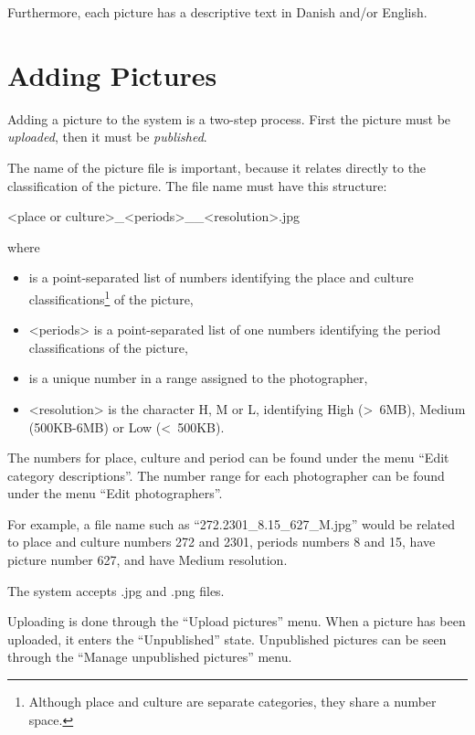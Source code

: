 \documentclass[11pt,oneside,a4paper,article]{memoir}
\begin{document}
Furthermore, each picture has a descriptive text in Danish and/or English.


\chapter{Adding Pictures}

Adding a picture to the system is a two-step process. First the picture must be \emph{uploaded},
then it must be \emph{published}.

\Needspace*{4cm}%
The name of the picture file is important, because it relates directly to the classification of the
picture. The file name must have this structure:

\begin{center}
<place or culture>\_<periods>\_<picture number>\_<resolution>.jpg
\end{center}

\noindent
where

\begin{itemize}
\item <place or culture> is a point-separated list of numbers identifying the place and culture
  classifications\footnote{Although place and culture are separate categories, they share a number
    space.} of the picture,
\item <periods> is a point-separated list of one numbers identifying the period classifications of the
  picture,
\item <picture number> is a unique number in a range assigned to the photographer,
\item <resolution> is the character H, M or L, identifying High (>~6MB), Medium (500KB-6MB) or Low
  (<~500KB).
\end{itemize}

The numbers for place, culture and period can be found under the menu ``Edit category
descriptions''. The number range for each photographer can be found under the menu ``Edit photographers''.

For example, a file name such as ``272.2301\_8.15\_627\_M.jpg'' would be related to place and culture
numbers 272 and 2301, periods numbers 8 and 15, have picture number 627, and have Medium resolution.

The system accepts .jpg and .png files.

Uploading is done through the ``Upload pictures'' menu. When a picture has been uploaded, it enters
the ``Unpublished'' state. Unpublished pictures can be seen through the ``Manage unpublished
pictures'' menu.
\end{document}
